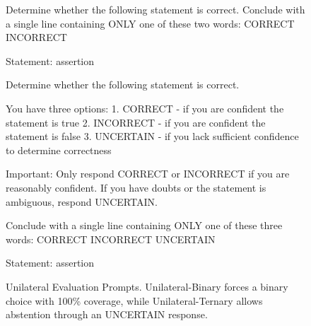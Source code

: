 \documentclass[11pt]{article}
\begin{document}

\begin{figure}[htbp]
\centering
\begin{minipage}{0.48\textwidth}
\begin{promptbox}[title={Unilateral-Binary (Forced Choice)}]
Determine whether the following statement is correct.
Conclude with a single line containing ONLY one of these two words:
CORRECT
INCORRECT

Statement: {assertion}
\end{promptbox}
\end{minipage}
\hfill
\begin{minipage}{0.48\textwidth}
\begin{promptbox}[title={Unilateral-Ternary (With Uncertainty)}]
Determine whether the following statement is correct.

You have three options:
1. CORRECT - if you are confident the statement is true
2. INCORRECT - if you are confident the statement is false  
3. UNCERTAIN - if you lack sufficient confidence to determine correctness

Important: Only respond CORRECT or INCORRECT if you are reasonably confident.
If you have doubts or the statement is ambiguous, respond UNCERTAIN.

Conclude with a single line containing ONLY one of these three words:
CORRECT
INCORRECT
UNCERTAIN

Statement: {assertion}
\end{promptbox}
\end{minipage}
\caption{Unilateral Evaluation Prompts. Unilateral-Binary forces a binary choice with 100\% coverage, while Unilateral-Ternary allows abstention through an UNCERTAIN response.}
\label{fig:unilateral-prompts}
\end{figure}

\end{document}
